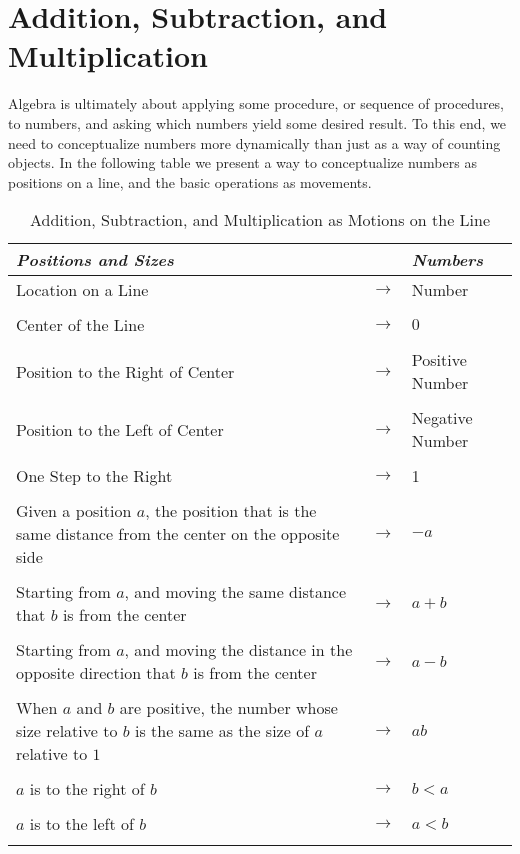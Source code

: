 \section{Addition, Subtraction, and Multiplication}
Algebra is ultimately about applying some procedure, or sequence of procedures, to numbers, and asking which numbers yield some desired result. To this end, we need to conceptualize numbers more dynamically than just as a way of counting objects. In the following table we present a way to conceptualize numbers as positions on a line, and the basic operations as movements.  


\begin{center}

\begin{table}
\begin{tabular}{|p{2in} c p{1.5in}|}
\hline\hline \it{Positions and Sizes} & & \it{Numbers}\\
\hline Location on a Line & $\longrightarrow$ & Number \\&&\\
Center of the Line & $\longrightarrow$ & $0$ \\&&\\
Position to the Right of Center & $\longrightarrow$ & Positive Number \\&&\\
Position to the Left of Center & $\longrightarrow$ & Negative Number \\&&\\
One Step to the Right & $\longrightarrow$ & 1 \\&&\\
Given a position $a$, the position that is the same distance from the center on  the opposite side & $\longrightarrow$ & $-a$\\&&\\ 
Starting from   $a$, and moving  the same distance that $b$ is from the center & $\longrightarrow$ & $a+b$\\&&\\
Starting from $a$, and moving the distance in the opposite direction that $b$ is from the center & $\longrightarrow$ & $a-b$\\&&\\
When $a$ and $b$ are positive, the number whose size relative to $b$ is the same as the size of $a$ relative to $1$ & $\longrightarrow$ & $ab$\\&&\\
$a$ is to the right of $b$ & $\longrightarrow$ & $b<a$\\&&\\
$a$ is to the left of $b$ & $\longrightarrow$ & $a<b$\\&&\\
\hline
\end{tabular} 
\caption{Addition, Subtraction, and Multiplication as Motions on the Line} \label{tab:a}
\end{table}
\end{center}


